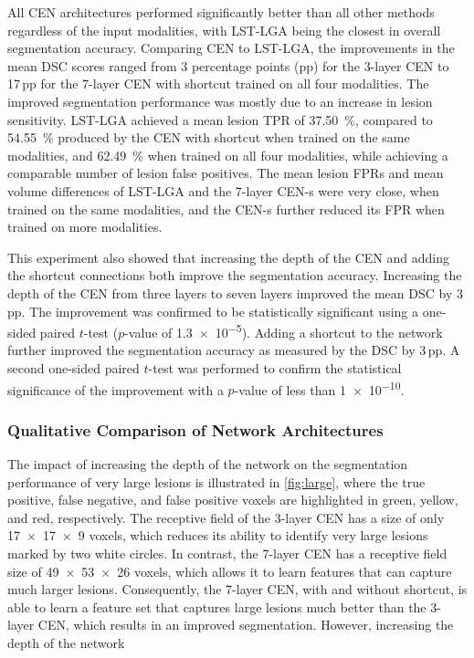 All CEN architectures performed significantly better than all other methods
regardless of the input modalities, with LST-LGA being the closest in overall
segmentation accuracy. Comparing CEN to LST-LGA, the improvements in the mean
DSC scores ranged from 3 percentage points (pp) for the 3-layer CEN to 17\,pp
for the 7-layer CEN with shortcut trained on all four modalities. The improved
segmentation performance was mostly due to an increase in lesion sensitivity.
LST-LGA achieved a mean lesion TPR of \SI{37.50}{\percent}, compared to
\SI{54.55}{\percent} produced by the CEN with shortcut when trained on the same
modalities, and \SI{62.49}{\percent} when trained on all four modalities, while
achieving a comparable number of lesion false positives. The mean lesion FPRs
and mean volume differences of LST-LGA and the 7-layer CEN-s were very close,
when trained on the same modalities, and the CEN-s further reduced its FPR when
trained on more modalities.

This experiment also showed that increasing the depth of the CEN and adding the
shortcut connections both improve the segmentation accuracy. Increasing the
depth of the CEN from three layers to seven layers improved the mean DSC by
3\,pp. The improvement was confirmed to be statistically significant using a
one-sided paired $t$-test ($p$-value of \num{1.3e-5}). Adding a shortcut to the
network further improved the segmentation accuracy as measured by the DSC by
3\,pp. A second one-sided paired $t$-test was performed to confirm the
statistical significance of the improvement with a $p$-value of less than
\num{1e-10}.

\subsubsection{Qualitative Comparison of Network Architectures}

The impact of increasing the depth of the network on the segmentation
performance of very large lesions is illustrated in \ref{fig:large}, where the
true positive, false negative, and false positive voxels are highlighted in
green, yellow, and red, respectively. The receptive field of the 3-layer CEN has
a size of only \num{17x17x9} voxels, which reduces its ability to identify very
large lesions marked by two white circles. In contrast, the 7-layer CEN has a
receptive field size of \num{49x53x26} voxels, which allows it to learn features
that can capture much larger lesions. Consequently, the 7-layer CEN, with and
without shortcut, is able to learn a feature set that captures large lesions
much better than the 3-layer CEN, which results in an improved segmentation.
However, increasing the depth of the network

